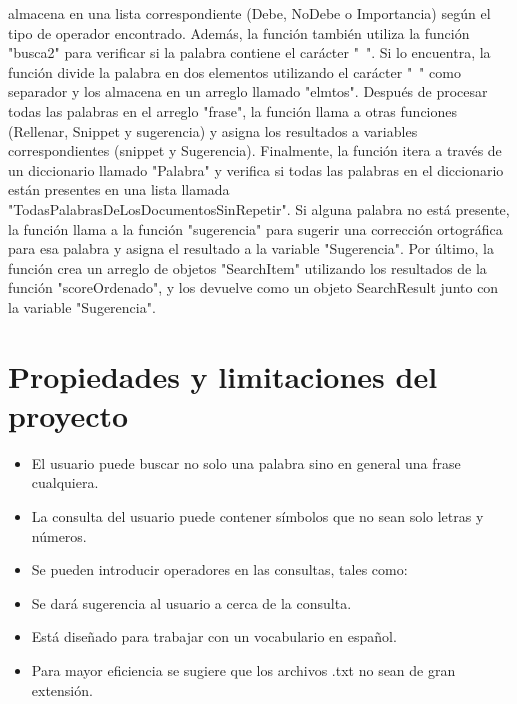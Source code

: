 \documentclass{article}
\begin{document}
\begin{itemize}
   almacena en una lista correspondiente (Debe, NoDebe o Importancia) según el 
   tipo de operador encontrado. 
   Además, la función también utiliza la función "busca2" para verificar si la 
   palabra contiene el carácter "~". Si lo encuentra, la función divide la palabra en 
   dos elementos utilizando el carácter "~" como separador y los almacena en un 
   arreglo llamado "elmtos". 
   Después de procesar todas las palabras en el arreglo "frase", la función llama a 
   otras funciones (Rellenar, Snippet y sugerencia) y asigna los resultados a 
   variables correspondientes (snippet y Sugerencia). 
   Finalmente, la función itera a través de un diccionario llamado "Palabra" y 
   verifica si todas las palabras en el diccionario están presentes en una lista 
   llamada "TodasPalabrasDeLosDocumentosSinRepetir". Si alguna palabra no 
   está presente, la función llama a la función "sugerencia" para sugerir una 
   corrección ortográfica para esa palabra y asigna el resultado a la variable 
   "Sugerencia". 
   Por último, la función crea un arreglo de objetos "SearchItem" utilizando los 
   resultados de la función "scoreOrdenado", y los devuelve como un objeto 
   SearchResult junto con la variable "Sugerencia".

\end{itemize}

\section{Propiedades y limitaciones del proyecto }
\begin{itemize}
    \item El usuario puede buscar no solo una palabra sino en general una frase 
    cualquiera. 
    \item La consulta del usuario puede contener símbolos que no sean solo letras y 
    números. 
    \item Se pueden introducir operadores en las consultas, tales como: 
    \item Se dará sugerencia al usuario a cerca de la consulta. 
    \item Está diseñado para trabajar con un vocabulario en español. 
    \item Para mayor eficiencia se sugiere que los archivos .txt no sean de gran 
    extensión. 
\end{itemize}
\end{document}
